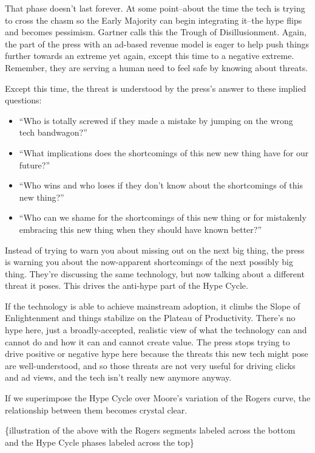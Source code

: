 That phase doesn't last forever. At some point--about the time the tech is trying to cross the chasm so the Early Majority can begin integrating it--the hype flips and becomes pessimism. Gartner calls this the Trough of Disillusionment. Again, the part of the press with an ad-based revenue model is eager to help push things further towards an extreme yet again, except this time to a negative extreme. Remember, they are serving a human need to feel safe by knowing about threats.

Except this time, the threat is understood by the press's answer to these implied questions:

\begin{itemize}
\item ``Who is totally screwed if they made a mistake by jumping on the wrong tech bandwagon?''
\item ``What implications does the shortcomings of this new new thing have for our future?''
\item ``Who wins and who loses if they don't know about the shortcomings of this new thing?''
\item ``Who can we shame for the shortcomings of this new thing or for mistakenly embracing this new thing when they should have known better?''
\end{itemize}

Instead of trying to warn you about missing out on the next big thing, the press is warning you about the now-apparent shortcomings of the next possibly big thing. They're discussing the same technology, but now talking about a different threat it poses. This drives the anti-hype part of the Hype Cycle.

If the technology is able to achieve mainstream adoption, it climbs the Slope of Enlightenment and things stabilize on the Plateau of Productivity. There's no hype here, just a broadly-accepted, realistic view of what the technology can and cannot do and how it can and cannot create value. The press stops trying to drive positive or negative hype here because the threats this new tech might pose are well-understood, and so those threats are not very useful for driving clicks and ad views, and the tech isn't really new anymore anyway.

If we superimpose the Hype Cycle over Moore's variation of the Rogers curve, the relationship between them becomes crystal clear.

\{illustration of the above with the Rogers segments labeled across the bottom and the Hype Cycle phases labeled across the top\}

